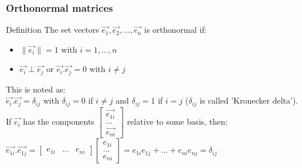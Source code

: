 \begin{frame}
	\frametitle{Orthonormal matrices}
	\begin{block}{Definition}
		The set vectors $\overrightarrow{e_1},\overrightarrow{e_2},...,\overrightarrow{e_n}$ is orthonormal if:
		\begin{itemize}
			\item $\|\overrightarrow{e_i}\|=1$ with $i=1,...,n$
			\item $\overrightarrow{e_i}\perp\overrightarrow{e_j}$ or $\overrightarrow{e_i}.\overrightarrow{e_j}=0$ with $i\neq j$
		\end{itemize}
		This is noted as:\\
		$\overrightarrow{e_i}.\overrightarrow{e_j}=\delta_{ij}$ with $\delta_{ij}=0$ if $i\neq j$ and $\delta_{ij}=1$ if $i=j$ ($\delta_{ij}$ is called 'Kronecker delta').\\
		If $\overrightarrow{e_{i}}$ has the components $\begin{bmatrix} \overrightarrow{e_{1i}}\\...\\\overrightarrow{e_{ni}}\end{bmatrix}$ relative to some basis, then:\\
		$\overrightarrow{e_{1i}}.\overrightarrow{e_{1j}}=\begin{bmatrix} e_{1i} & ... & e_{ni}\end{bmatrix} \begin{bmatrix} e_{1i}\\...\\e_{ni}\end{bmatrix}=e_{1i}e_{1j}+...+e_{ni}e_{nj}=\delta_{ij}$
	\end{block}
\end{frame}

